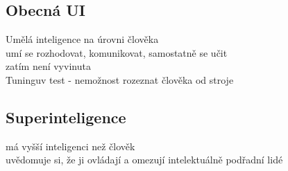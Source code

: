 \subsection*{Obecná UI}
Umělá inteligence na úrovni člověka\\
umí se rozhodovat, komunikovat, samostatně se učit\\
zatím není vyvinuta\\
Tuninguv test - nemožnost rozeznat člověka od stroje\\

\subsection*{Superinteligence}
má vyšší inteligenci než člověk\\
uvědomuje si, že ji ovládají a omezují intelektuálně podřadní lidé\\



